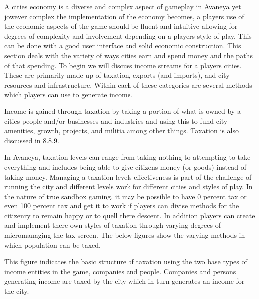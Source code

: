 


A cities economy is a diverse and complex aspect of gameplay in Avaneya yet jowever complex the implementation of the economy becomes, a players use of the economic aspects of the game should be fluent and intuitive allowing for degrees of complexity and involvement depending on a players style of play. This can be done with a good user interface and solid economic construction. This section deals with the variety of ways cities earn and spend money and the paths of that spending. To begin we will discuss income streams for a players cities. These are primarily made up of taxation, exports (and imports), and city resources and infrastructure. Within each of these categories are several methods which players can use to generate income.


Income is gained through taxation by taking a portion of what is owned by a cities people and/or businesses and industries and using this to fund city amenities, growth, projects, and militia among other things. Taxation is also discussed in 8.8.9.

In Avaneya, taxation levels can range from taking nothing to attempting to take everything and includes being able to give citizens money (or goods) instead of taking money. Managing a taxation levels effectiveness is part of the challenge of running the city and different levels work for different cities and styles of play. In the nature of true sandbox gaming, it may be possible to have 0 percent tax or even 100 percent tax and get it to work if players can divise methods for the citizenry to remain happy or to quell there descent. In addition players can create and implement there own styles of taxation through varying degrees of micromanaging the tax screen. The below figures show the varying methods in which population can be taxed.

This figure indicates the basic structure of taxation using the two base types of income entities in the game, companies and people. Companies and persons generating income are taxed by the city which in turn generates an income for the city.  

